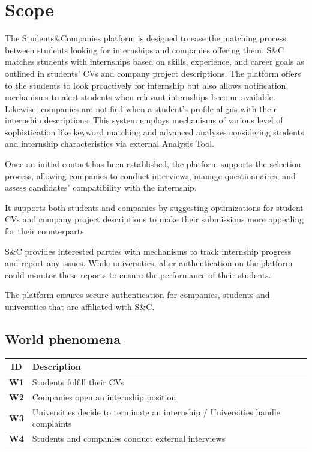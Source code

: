 \section{Scope}\label{sec:scope}
The Students\&Companies platform is designed to ease the matching process between students looking for internships and companies offering them.
S\&C matches students with internships based on skills, experience, and career goals as outlined in students' CVs and company project descriptions.
The platform offers to the students to look proactively for internship but also allows notification mechanisms to alert students when relevant internships become available.
Likewise, companies are notified when a student’s profile aligns with their internship descriptions.
This system employs mechanisms of various level of sophistication like keyword matching and advanced analyses considering students and internship characteristics via external Analysis Tool.

Once an initial contact has been established, the platform supports the selection process, allowing companies to conduct interviews, manage questionnaires, and assess candidates’ compatibility with the internship.

It supports both students and companies by suggesting optimizations for student CVs and company project descriptions to make their submissions more appealing for their counterparts.

S\&C provides interested parties with mechanisms to track internship progress and report any issues.
While universities, after authentication on the platform could monitor these reports to ensure the performance of their students.

The platform ensures secure authentication for companies, students and universities that are affiliated with S\&C.

\subsection{World phenomena}\label{subsec:world-phenomena}
\renewcommand{\arraystretch}{1.5} %
\begin{center}
    \begin{longtable}{|c|p{}|}
        \hline
        \rowcolor[HTML]{D6EAF8} %
        \textbf{ID} & \textbf{Description} \\ \hline
        \rowcolor[HTML]{FFFFFF} %
        \textbf{W1} & Students fulfill their CVs \\ \hline
        \rowcolor[HTML]{F0F0F0} %
        \textbf{W2} & Companies open an internship position \\ \hline
        \rowcolor[HTML]{FFFFFF} %
        \textbf{W3} & Universities decide to terminate an internship / Universities handle complaints \\ \hline
        \rowcolor[HTML]{F0F0F0} %
        \textbf{W4} & Students and companies conduct external interviews  \\ \hline
    \end{longtable}
\end{center}

